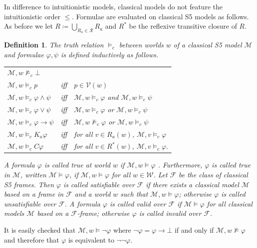 \documentclass{myifcolog}
\newcommand\C {C}
\newcommand{\K}{K}
\newcommand{\agi}{a}
\newcommand{\fw}{\mathcal{M}}
\newcommand{\W}{\mathcal{W}}
\newcommand{\rel}{\mathcal{R}}
\newcommand{\V}{\mathcal{V}}
\newcommand{\fclass}{\mathscr{F}}
\newtheorem{definition}[theorem]{Definition}
\numberwithin{theorem}{section}
\begin{document}
In difference to intuitionistic models, classical models do not feature the intuitionistic order $\leq$. Formulae are evaluated on classical S5 models as follows. As before we let $R \coloneqq \bigcup_{R_\agi \in \rel} R_\agi$ and $R^*$ be the reflexive transitive closure of $R$.

\begin{definition}
    The truth relation $\models_c$ between worlds $w$ of a classical S5 model $\fw$ and formulae $\varphi, \psi$ is defined inductively as follows.
\begin{center}
    \begin{tabular}{l l l}
        $\fw, w \not \models_c \bot$ &&\\
        $\fw, w \models_c p$ & iff & $p \in \V(w)$ \\
        $\fw, w \models_c \varphi \wedge \psi$ & iff & $\fw, w \models_c \varphi$ and $\fw, w \models_c \psi$\\
        $\fw, w \models_c \varphi \vee \psi$ & iff & $\fw, w \models_c \varphi$ or $\fw, w \models_c \psi$ \\
        $\fw, w \models_c \varphi \rightarrow \psi$ & iff & $\fw, w \not \models_c \varphi$ or $\fw, w \models_c \psi$ \\
        $\fw, w \models_c \K_\agi \varphi$ & iff & for all $v \in R_\agi(w)$, $\fw, v \models_c \varphi$ \\
        $\fw, w \models_c \C \varphi$ & iff & for all $v \in R^*(w)$, $\fw, v \models_c \varphi$.
    \end{tabular}
\end{center}
A formula $\varphi$ is called \emph{true at world $w$} if $\fw, w \models \varphi$ . Furthermore, $\varphi$ is called \emph{true in $\fw$}, written $\fw \models \varphi$, if $\fw, w \models \varphi$ for all $w \in \W$. Let $\fclass$ be the class of classical S5 frames. Then $\varphi$ is called \emph{satisfiable} over $\fclass$ if there exists a classical model $\fw$ based on a frame in $\fclass$ and a world $w$ such that $\fw, w \models \varphi$; otherwise $\varphi$ is called \emph{unsatisfiable} over $\fclass$. A formula $\varphi$ is called \emph{valid} over $\fclass$ if $\fw \models \varphi$ for all classical models $\fw$ based on a $\fclass$-frame; otherwise $\varphi$ is called \emph{invalid} over $\fclass$.
\end{definition}

It is easily checked that $\fw, w \models \neg \varphi$ where $\neg \varphi = \varphi \rightarrow \bot$ if and only if $\fw, w \not \models \varphi$ and therefore that $\varphi$ is equivalent to $\neg \neg \varphi$.
\end{document}

